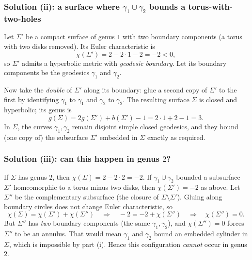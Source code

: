 \documentclass[12pt,a4paper]{article}
\theoremstyle{plain}
\theoremstyle{definition}      %
\begin{document}
\subsubsection*{Solution (ii): a surface where $\gamma_1\cup\gamma_2$ bounds a torus-with-two-holes}
Let $\Sigma'$ be a compact surface of genus $1$ with two boundary components (a torus with two disks removed).
Its Euler characteristic is
\[
\chi(\Sigma')=2-2\cdot 1-2=-2<0,
\]
so $\Sigma'$ admits a hyperbolic metric with \emph{geodesic boundary}.
Let its boundary components be the geodesics $\gamma_1$ and $\gamma_2$.

Now take the \emph{double} of $\Sigma'$ along its boundary:
glue a second copy of $\Sigma'$ to the first by identifying $\gamma_1$ to $\gamma_1$ and $\gamma_2$ to $\gamma_2$.
The resulting surface $\Sigma$ is closed and hyperbolic; its genus is
\[
g(\Sigma)=2g(\Sigma')+b(\Sigma')-1=2\cdot 1+2-1=3.
\]
In $\Sigma$, the curves $\gamma_1,\gamma_2$ remain disjoint simple closed geodesics, and they bound (one copy of) the subsurface $\Sigma'$
embedded in $\Sigma$ exactly as required.

\subsubsection*{Solution (iii): can this happen in genus $2$?}
If $\Sigma$ has genus $2$, then $\chi(\Sigma)=2-2\cdot 2=-2$.
If $\gamma_1\cup\gamma_2$ bounded a subsurface $\Sigma'$ homeomorphic to a torus minus two disks, then $\chi(\Sigma')=-2$ as above.
Let $\Sigma''$ be the complementary subsurface (the closure of $\Sigma\setminus \Sigma'$).
Gluing along boundary circles does not change Euler characteristic, so
\[
\chi(\Sigma)=\chi(\Sigma')+\chi(\Sigma'') \quad\Longrightarrow\quad
-2=-2+\chi(\Sigma'') \quad\Longrightarrow\quad \chi(\Sigma'')=0.
\]
But $\Sigma''$ has \emph{two} boundary components (the same $\gamma_1,\gamma_2$), and $\chi(\Sigma'')=0$ forces $\Sigma''$ to be an annulus.
That would mean $\gamma_1$ and $\gamma_2$ bound an embedded cylinder in $\Sigma$, which is impossible by part (i).
Hence this configuration \emph{cannot} occur in genus $2$.
\end{document}
